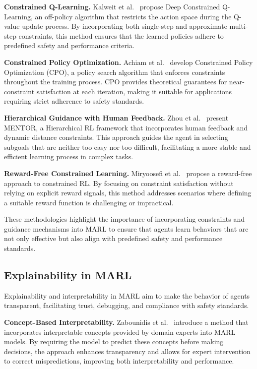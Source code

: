 \documentclass[pdflatex,sn-mathphys-num]{sn-jnl}%
\theoremstyle{thmstyleone}%
\theoremstyle{thmstyletwo}%
\theoremstyle{thmstylethree}%
\begin{document}
\textbf{Constrained Q-Learning.} Kalweit et al.~\cite{kalweit2020deep} propose Deep Constrained Q-Learning, an off-policy algorithm that restricts the action space during the Q-value update process. By incorporating both single-step and approximate multi-step constraints, this method ensures that the learned policies adhere to predefined safety and performance criteria.

\textbf{Constrained Policy Optimization.} Achiam et al.~\cite{achiam2017constrained} develop Constrained Policy Optimization (CPO), a policy search algorithm that enforces constraints throughout the training process. CPO provides theoretical guarantees for near-constraint satisfaction at each iteration, making it suitable for applications requiring strict adherence to safety standards.

\textbf{Hierarchical Guidance with Human Feedback.} Zhou et al.~\cite{zhou2024mentor} present MENTOR, a Hierarchical RL framework that incorporates human feedback and dynamic distance constraints. This approach guides the agent in selecting subgoals that are neither too easy nor too difficult, facilitating a more stable and efficient learning process in complex tasks.

\textbf{Reward-Free Constrained Learning.} Miryoosefi et al.~\cite{miryoosefi2022simple} propose a reward-free approach to constrained RL. By focusing on constraint satisfaction without relying on explicit reward signals, this method addresses scenarios where defining a suitable reward function is challenging or impractical.

These methodologies highlight the importance of incorporating constraints and guidance mechanisms into MARL to ensure that agents learn behaviors that are not only effective but also align with predefined safety and performance standards.


\subsection{Explainability in MARL}\label{sub-sec:rel_evaluation}

Explainability and interpretability in MARL aim to make the behavior of agents transparent, facilitating trust, debugging, and compliance with safety standards.

\textbf{Concept-Based Interpretability.} Zabounidis et al.~\cite{zabounidis2023concept} introduce a method that incorporates interpretable concepts provided by domain experts into MARL models. By requiring the model to predict these concepts before making decisions, the approach enhances transparency and allows for expert intervention to correct mispredictions, improving both interpretability and performance.
\end{document}
